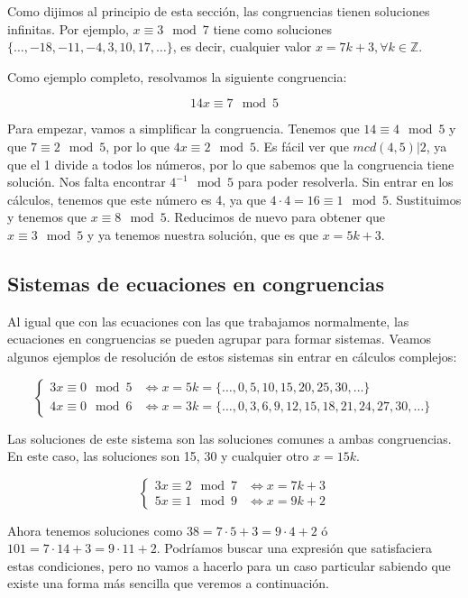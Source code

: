 Como dijimos al principio de esta sección, las congruencias tienen soluciones infinitas.
Por ejemplo, $x \equiv 3 \mod 7$ tiene como soluciones $\{\ldots, -18, -11, -4, 3, 10, 17, \ldots\}$, es decir, cualquier valor $x = 7k + 3, \forall k \in\mathbb{Z}$.

Como ejemplo completo, resolvamos la siguiente congruencia:

\[14x \equiv 7 \mod 5\]

Para empezar, vamos a simplificar la congruencia.
Tenemos que $14 \equiv 4 \mod 5$ y que $7 \equiv 2 \mod 5$, por lo que $4x \equiv 2 \mod 5$.
Es fácil ver que $mcd(4,5)|2$, ya que el 1 divide a todos los números, por lo que sabemos que la congruencia tiene solución.
Nos falta encontrar $4^{-1} \mod 5$ para poder resolverla.
Sin entrar en los cálculos, tenemos que este número es 4, ya que $4 \cdot 4 = 16 \equiv 1 \mod 5$.
Sustituimos y tenemos que $x \equiv 8 \mod 5$.
Reducimos de nuevo para obtener que $x \equiv 3 \mod 5$ y ya tenemos nuestra solución, que es que $x = 5k + 3$.

\subsection{Sistemas de ecuaciones en congruencias}

Al igual que con las ecuaciones con las que trabajamos normalmente, las ecuaciones en congruencias se pueden agrupar para formar sistemas.
Veamos algunos ejemplos de resolución de estos sistemas sin entrar en cálculos complejos:

\[
\left\{
\begin{array}{ll}
	3x \equiv 0 \mod 5 & \iff x = 5k = \{\ldots, 0, 5, 10, 15, 20, 25, 30, \ldots\} \\
	4x \equiv 0 \mod 6 & \iff x = 3k = \{\ldots, 0, 3, 6, 9, 12, 15, 18, 21, 24, 27, 30, \ldots\}
\end{array}
\right.
\]

Las soluciones de este sistema son las soluciones comunes a ambas congruencias.
En este caso, las soluciones son 15, 30 y cualquier otro $x = 15k$.

\[
\left\{
\begin{array}{ll}
	3x \equiv 2 \mod 7 & \iff x = 7k + 3 \\
	5x \equiv 1 \mod 9 & \iff x = 9k + 2
\end{array}
\right.
\]

Ahora tenemos soluciones como $38 = 7\cdot 5 + 3 = 9 \cdot 4 + 2$ ó $101 = 7 \cdot 14 + 3 = 9 \cdot 11 + 2$.
Podríamos buscar una expresión que satisfaciera estas condiciones, pero no vamos a hacerlo para un caso particular sabiendo que existe una forma más sencilla que veremos a continuación.

